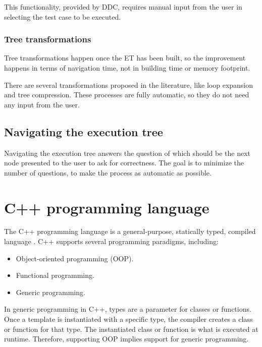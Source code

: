 This functionality, provided by DDC, requires manual input from the user in selecting the test case to be executed.


\subsubsection{Tree transformations}
Tree transformations happen once the ET has been built, so the improvement happens in terms of navigation time, not in building time or memory footprint.

There are several transformations proposed in the literature, like loop expansion and tree compression.
These processes are fully automatic, so they do not need any input from the user.

\subsection{Navigating the execution tree}
Navigating the execution tree answers the question of which should be the next node presented to the user to ask for correctness.
The goal is to minimize the number of questions, to make the process as automatic as possible.
\section{C++ programming language}
The C++ programming language is a general-purpose, statically typed, compiled language \cite{cppHistory}.
%
C++ supports several programming paradigms, including:

\begin{itemize}
    \item Object-oriented programming (OOP).
    \item Functional programming.
    \item Generic programming.
\end{itemize}

In generic programming in C++, types are a parameter for classes or functions.
Once a template is instantiated with a specific type, the compiler creates a class or function for that type.
The instantiated class or function is what is executed at runtime. Therefore, supporting OOP implies support for generic programming.

